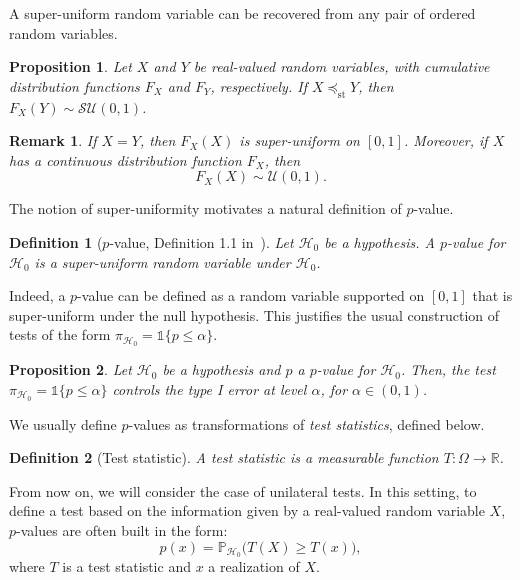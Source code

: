 \documentclass[a4paper,11pt]{article}
\theoremstyle{plain}
\newcommand{\1}{\mathbf{1}}
\newtheorem{proposition}{Proposition}
\newtheorem{definition}{Definition}
\newtheorem{remark}{Remark}
\begin{document}
A super-uniform random variable can be recovered from any pair of ordered random variables.

\begin{proposition}\label{prop_repartition}
  Let $X$ and $Y$ be real-valued random variables, with cumulative distribution functions $F_X$ and $F_Y$, respectively.
  If $X \preceq_{\mathrm{st}} Y$, then $F_X(Y) \sim \mathcal{SU}(0,1)$.
\end{proposition}


\begin{remark}\label{remark_FXX_unif}
If \(X=Y\), then \(F_X(X)\) is super-uniform on \([0,1]\).  
Moreover, if \(X\) has a continuous distribution function \(F_X\), then
\begin{equation}
F_X(X) \sim \mathcal{U}(0,1).
\end{equation}
\end{remark}

The notion of super-uniformity motivates a natural definition of $p$-value.

\begin{definition}[$p$-value, Definition 1.1 in~\cite{Ramdas}]\label{def_pvalue}
  Let $\mathcal{H}_0$ be a hypothesis. A $p$-value for $\mathcal{H}_0$ is a super-uniform random variable under $\mathcal{H}_0$. 
\end{definition}

Indeed, a $p$-value can be defined as a random variable supported on $[0,1]$ that is super-uniform under the null hypothesis. This justifies the usual construction of tests of the form $\pi_{\mathcal{H}_0} = \mathds{1}\{p \leq \alpha \}$.

\begin{proposition}\label{prop_rejection_rule}
  Let $\mathcal{H}_0$ be a hypothesis and $p$ a $p$-value for $\mathcal{H}_0$. Then, the test $\pi_{\mathcal{H}_0} = \mathds{1}{\{p \leq \alpha\}}$ controls the type I error at level $\alpha$, for $\alpha\in(0,1)$. 
\end{proposition}


We usually define $p$-values as transformations of \textit{test statistics}, defined below.

\begin{definition}[Test statistic]
  A test statistic is a measurable function $T : \Omega \to \mathbb{R}$.
\end{definition}

From now on, we will consider the case of unilateral tests. In this setting, to define a test based on the information given by a real-valued random variable $X$, $p$-values are often built in the form: 
\begin{equation}\label{unilateral_uniform_pvalue}
  p(x) = \mathbb{P}_{\mathcal{H}_0}\bigl(T(X) \geq T(x)\bigr),
\end{equation}
where $T$ is a test statistic and $x$ a realization of $X$.
\end{document}
